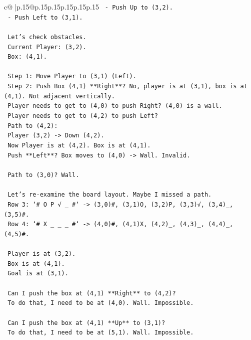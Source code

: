 \documentclass{article}
\begin{document}
{\begin{supertabular}{c@{$\;$}|p{.15\linewidth}@{}p{.15\linewidth}p{.15\linewidth}p{.15\linewidth}p{.15\linewidth}p{.15\linewidth}}
{{{\texttt{      {-} Push Up to (3,2).} \\
\texttt{      {-} Push Left to (3,1).} \\
\\ 
\texttt{      Let's check obstacles.} \\
\texttt{      Current Player: (3,2).} \\
\texttt{      Box: (4,1).} \\
\\ 
\texttt{      Step 1: Move Player to (3,1) (Left).} \\
\texttt{      Step 2: Push Box (4,1) **Right**? No, player is at (3,1), box is at (4,1). Not adjacent vertically.} \\
\texttt{      Player needs to get to (4,0) to push Right? (4,0) is a wall.} \\
\texttt{      Player needs to get to (4,2) to push Left?} \\
\texttt{      Path to (4,2):} \\
\texttt{      Player (3,2) {-}> Down (4,2).} \\
\texttt{      Now Player is at (4,2). Box is at (4,1).} \\
\texttt{      Push **Left**? Box moves to (4,0) {-}> Wall. Invalid.} \\
\\ 
\texttt{      Path to (3,0)? Wall.} \\
\\ 
\texttt{      Let's re{-}examine the board layout. Maybe I missed a path.} \\
\texttt{      Row 3: `\# O P √ \_ \#` {-}> (3,0)\#, (3,1)O, (3,2)P, (3,3)√, (3,4)\_, (3,5)\#.} \\
\texttt{      Row 4: `\# X \_ \_ \_ \#` {-}> (4,0)\#, (4,1)X, (4,2)\_, (4,3)\_, (4,4)\_, (4,5)\#.} \\
\\ 
\texttt{      Player is at (3,2).} \\
\texttt{      Box is at (4,1).} \\
\texttt{      Goal is at (3,1).} \\
\\ 
\texttt{      Can I push the box at (4,1) **Right** to (4,2)?} \\
\texttt{      To do that, I need to be at (4,0). Wall. Impossible.} \\
\\ 
\texttt{      Can I push the box at (4,1) **Up** to (3,1)?} \\
\texttt{      To do that, I need to be at (5,1). Wall. Impossible.} \\
}}}
\end{supertabular}}
\end{document}
